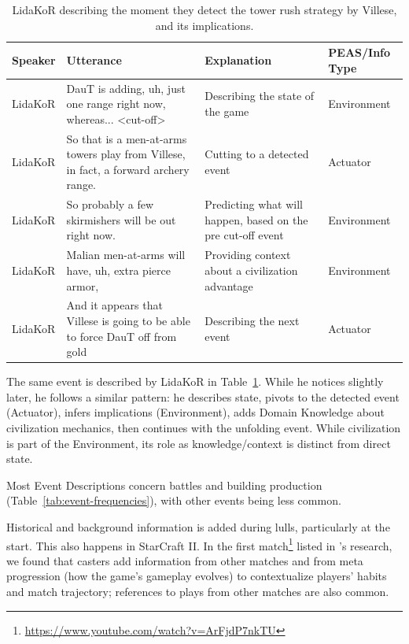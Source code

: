 \begin{table}[!htbp]
  \caption{LidaKoR describing the moment they detect the tower rush strategy by Villese, and its implications.}
  \label{tab:lidakor-example-forward-tower}
  \centering
  \setlength{\tabcolsep}{4pt}
  \renewcommand{\arraystretch}{1.3}
  \begin{tabularx}{\textwidth}{@{}l>{\raggedright\arraybackslash}p{7cm}>{\raggedright\arraybackslash}p{4cm}>{\centering\arraybackslash}p{2cm}@{}}
    \toprule
    \textbf{Speaker} & \textbf{Utterance} & \textbf{Explanation} & \textbf{PEAS/Info Type} \\
    \midrule
    LidaKoR & DauT is adding, uh, just one range right now, whereas... <cut-off> & Describing the state of the game & Environment \\
    LidaKoR & So that is a men-at-arms towers play from Villese, in fact, a forward archery range. & Cutting to a detected event & Actuator \\
    LidaKoR & So probably a few skirmishers will be out right now. & Predicting what will happen, based on the pre cut-off event & Environment \\
    LidaKoR & Malian men-at-arms will have, uh, extra pierce armor, & Providing context about a civilization advantage & Environment \\
    LidaKoR & And it appears that Villese is going to be able to force DauT off from gold & Describing the next event & Actuator \\
    \bottomrule
  \end{tabularx}
\end{table}

The same event is described by LidaKoR in Table~\ref{tab:lidakor-example-forward-tower}. While he notices slightly later, he follows a similar pattern: he describes state, pivots to the detected event (Actuator), infers implications (Environment), adds Domain Knowledge about civilization mechanics, then continues with the unfolding event. While civilization is part of the Environment, its role as knowledge/context is distinct from direct state.

Most Event Descriptions concern battles and building production (Table~\ref{tab:event-frequencies}), with other events being less common.

Historical and background information is added during lulls, particularly at the start. This also happens in StarCraft II. In the first match\footnote{\url{https://www.youtube.com/watch?v=ArFjdP7nkTU}} listed in \citet{dodge2018}'s research, we found that casters add information from other matches and from meta progression (how the game's gameplay evolves) to contextualize players’ habits and match trajectory; references to plays from other matches are also common.

